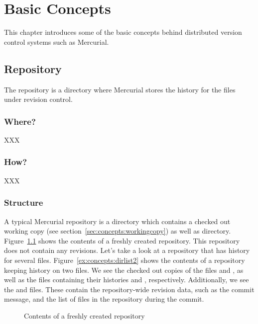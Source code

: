 \chapter{Basic Concepts}
\label{chap:concepts}

This chapter introduces some of the basic concepts behind distributed
version control systems such as Mercurial.

\section{Repository}
\label{sec:concepts:repo}
The repository is a directory where Mercurial stores the history for the
files under revision control.

\subsection{Where?}
XXX

\subsection{How?}
XXX

\subsection{Structure}
\label{sec:concepts:structure}
A typical Mercurial repository is a directory which contains a checked out
working copy (see section~\ref{sec:concepts:workingcopy}) as well as
 directory.  Figure~\ref{ex:concepts:dirlist} shows the
contents of a freshly created repository.  This repository does not contain
any revisions. Let's take a look at a repository that has history for
several files.
Figure~\ref{ex:concepts:dirlist2} shows the contents of a repository keeping
history on two files.  We see the checked out copies of the files
 and , as well as the files containing their
histories  and , respectively. Additionally,
we see the  and  files. These
contain the repository-wide revision data, such as the commit message, and
the list of files in the repository during the commit.

\begin{figure}[ht]
  \caption{Contents of a freshly created repository}
  \label{ex:concepts:dirlist}
\end{figure}

